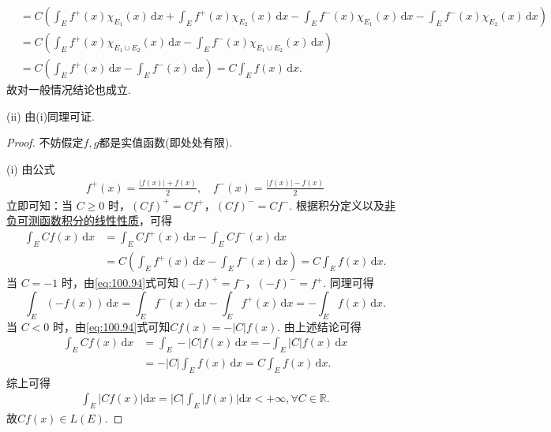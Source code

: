 \documentclass[../../main.tex]{subfiles}%
\begin{document}
\begin{remark}
\begin{align*}
&= C \left( \int_E f^+(x) \chi_{E_1}(x) \, \mathrm{d}x + \int_E f^+(x) \chi_{E_2}(x) \, \mathrm{d}x - \int_E f^-(x) \chi_{E_1}(x) \, \mathrm{d}x - \int_E f^-(x) \chi_{E_2}(x) \, \mathrm{d}x \right) \\
&= C \left( \int_E f^+(x) \chi_{E_1 \cup E_2}(x) \, \mathrm{d}x - \int_E f^-(x) \chi_{E_1 \cup E_2}(x) \, \mathrm{d}x \right) \\
&= C \left( \int_E f^+(x) \, \mathrm{d}x - \int_E f^-(x) \, \mathrm{d}x \right) = C \int_E f(x) \, \mathrm{d}x.
\end{align*}
故对一般情况结论也成立.

(ii) 由(i)同理可证.
\end{remark}
\begin{proof}

不妨假定$f,g$都是实值函数(即处处有限).

(i) 由公式
\begin{align}\label{eq:100.94}
f^+(x) = \frac{|f(x)| + f(x)}{2}, \quad f^-(x) = \frac{|f(x)| - f(x)}{2}
\end{align}
立即可知：当 \( C \geqslant  0 \) 时，\( (Cf)^+ = Cf^+ \)，\( (Cf)^- = Cf^- \). 根据积分定义以及\hyperref[theorem:非负可测函数积分的线性性质]{非负可测函数积分的线性性质}，可得
\begin{align*}
\int_E Cf(x) \, \mathrm{d}x &= \int_E Cf^+(x) \, \mathrm{d}x - \int_E Cf^-(x) \, \mathrm{d}x \\
&= C \left( \int_E f^+(x) \, \mathrm{d}x - \int_E f^-(x) \, \mathrm{d}x \right) = C \int_E f(x) \, \mathrm{d}x.
\end{align*}
当 \( C = -1 \) 时，由\eqref{eq:100.94}式可知\( (-f)^+ = f^- \)，\( (-f)^- = f^+ \). 同理可得
\[
\int_E (-f(x)) \, \mathrm{d}x = \int_E f^-(x) \, \mathrm{d}x - \int_E f^+(x) \, \mathrm{d}x = - \int_E f(x) \, \mathrm{d}x.
\]
当 \( C < 0 \) 时，由\eqref{eq:100.94}式可知\( Cf(x) = -|C|f(x) \). 由上述结论可得
\begin{align*}
\int_E Cf(x) \, \mathrm{d}x &= \int_E -|C| f(x) \, \mathrm{d}x = - \int_E |C|f(x) \, \mathrm{d}x \\
&= -|C| \int_E f(x) \, \mathrm{d}x = C \int_E f(x) \, \mathrm{d}x.
\end{align*}
综上可得
\begin{align*}
\int_E{\left| Cf\left( x \right) \right|\mathrm{d}x}=\left| C \right|\int_E{\left| f\left( x \right) \right|\mathrm{d}x}<+\infty ,\forall C\in \mathbb{R} .
\end{align*}
故\( Cf(x)\in L(E) \).


\end{proof}
\end{document}
